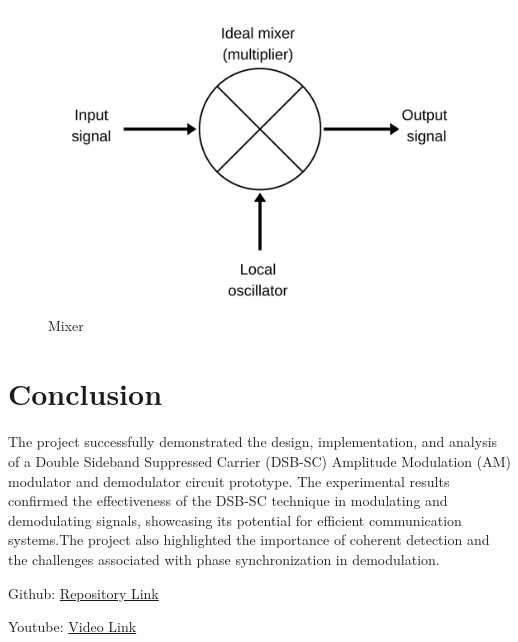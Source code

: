 \documentclass[conference]{IEEEtran}
\begin{document}
\begin{figure}
    \centering
    \includegraphics[width=0.85\linewidth]{mixer.png}
    \caption{Mixer}
\end{figure}



\section{Conclusion}
The project successfully demonstrated the design, implementation, and analysis of a Double Sideband Suppressed Carrier (DSB-SC) Amplitude Modulation (AM) modulator and demodulator circuit prototype. The experimental results confirmed the effectiveness of the DSB-SC technique in modulating and demodulating signals, showcasing its potential for efficient communication systems.The project also highlighted the importance of coherent detection and the challenges associated with phase synchronization in demodulation.

Github: \href{https://github.com/MadhanSaiKrishna/AM-Modulator-Demodulator}{Repository Link}

Youtube: \href{}{Video Link}
\end{document}
